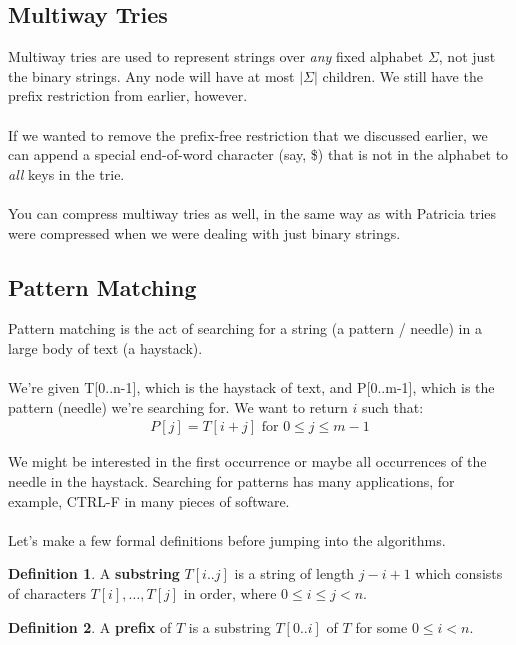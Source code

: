 \documentclass[]{article}
\theoremstyle{definition}
\newtheorem*{defn}{Definition}
\begin{document}
		\subsection{Multiway Tries}
			Multiway tries are used to represent strings over \emph{any} fixed alphabet $\Sigma$, not just the binary strings. Any node will have at most $|\Sigma|$ children. We still have the prefix restriction from earlier, however.
			\\ \\
			If we wanted to remove the prefix-free restriction that we discussed earlier, we can append a special end-of-word character (say, \$) that is not in the alphabet to \emph{all} keys in the trie.
			\\ \\
			You can compress multiway tries as well, in the same way as with Patricia tries were compressed when we were dealing with just binary strings.

		\subsection{Pattern Matching}
			Pattern matching is the act of searching for a string (a pattern / needle) in a large body of text (a haystack).
			\\ \\
			We're given T[0..n-1], which is the haystack of text, and P[0..m-1], which is the pattern (needle) we're searching for. We want to return $i$ such that:
			\begin{align*}
				P[j] = T[i + j] \text{ for } 0 \le j \le m - 1
			\end{align*}

			We might be interested in the first occurrence or maybe all occurrences of the needle in the haystack. Searching for patterns has many applications, for example, CTRL-F in many pieces of software.
			\\ \\
			Let's make a few formal definitions before jumping into the algorithms.

			\begin{defn}
				A \textbf{substring} $T[i..j]$ is a string of length $j - i + 1$ which consists of characters $T[i], \ldots, T[j]$ in order, where $0 \le i \le j < n$.
			\end{defn}

			\begin{defn}
				A \textbf{prefix} of $T$ is a substring $T[0..i]$ of $T$ for some $0 \le i < n$.
			\end{defn}
\end{document}
